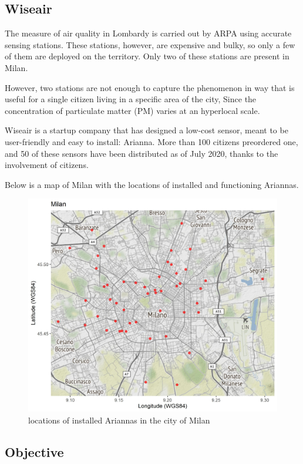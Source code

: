 \documentclass{article}
\begin{document}
\subsection{Wiseair}

The measure of air quality in Lombardy is carried out by ARPA using accurate sensing stations. These stations, however,
 are expensive and bulky, so only a few of them are deployed on the territory. Only two of these stations are present in Milan. 

However, two stations are not enough to capture the phenomenon in way that is useful for a single citizen living in a specific area of the city,
 Since the concentration of particulate matter (PM) varies at an hyperlocal scale. 

Wiseair is a startup company that has designed a low-cost sensor, meant to be user-friendly and easy to install: Arianna.
 More than 100 citizens preordered one, and 50 of these sensors have been distributed as of July 2020, thanks to the involvement of citizens.

 Below is a map of Milan with the locations of installed and functioning Ariannas.

 \begin{figure}[h!]
  \centering
  \includegraphics[width=5in]{potsMap.jpg}
  \caption{locations of installed Ariannas in the city of Milan}
\end{figure}

\subsection{Objective}
\end{document}
